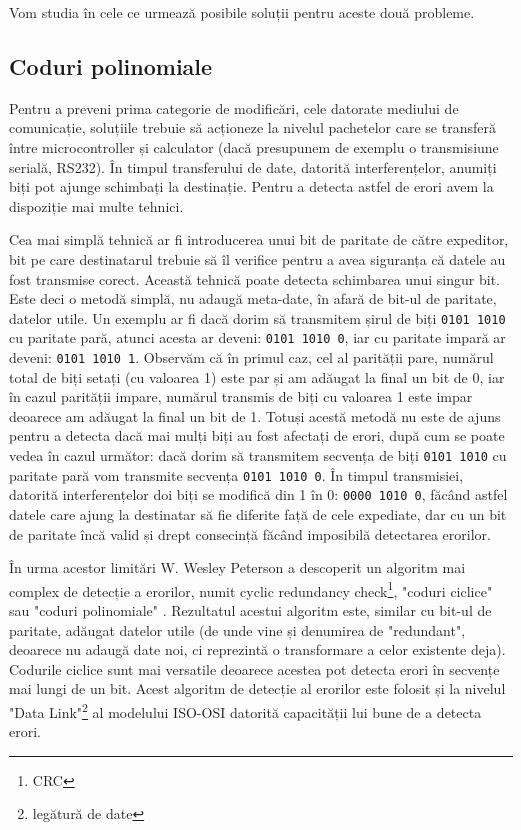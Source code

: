 \documentclass[12pt,a4paper,titlepage]{report}
\begin{document}
Vom studia în cele ce urmează posibile soluții pentru aceste două probleme.

\subsection{Coduri polinomiale}
Pentru a preveni prima categorie de modificări, cele datorate mediului de comunicație, soluțiile trebuie să acționeze la nivelul pachetelor care se transferă între microcontroller și calculator (dacă presupunem de exemplu o transmisiune serială, RS232). În timpul transferului de date, datorită interferențelor, anumiți biți pot ajunge schimbați la destinație. Pentru a detecta astfel de erori avem la dispoziție mai multe tehnici.

Cea mai simplă tehnică ar fi introducerea unui bit de paritate de către expeditor, bit pe care destinatarul trebuie să îl verifice pentru a avea siguranța că datele au fost transmise corect. Această tehnică poate detecta schimbarea unui singur bit. Este deci o metodă simplă, nu adaugă meta-date, în afară de bit-ul de paritate, datelor utile. Un exemplu ar fi dacă dorim să transmitem șirul de biți \texttt{0101 1010} cu paritate pară, atunci acesta ar deveni: \texttt{0101 1010 0}, iar cu paritate impară ar deveni: \texttt{0101 1010 1}. Observăm că în primul caz, cel al parității pare, numărul total de biți setați (cu valoarea 1) este par și am adăugat la final un bit de 0, iar în cazul parității impare, numărul transmis de biți cu valoarea 1 este impar deoarece am adăugat la final un bit de 1. Totuși acestă metodă nu este de ajuns pentru a detecta dacă mai mulți biți au fost afectați de erori, după cum se poate vedea în cazul următor: dacă dorim să transmitem secvența de biți \texttt{0101 1010} cu paritate pară vom transmite secvența \texttt{0101 1010 0}. În timpul transmisiei, datorită interferențelor doi biți se modifică din 1 în 0: \texttt{0000 1010 0}, făcând astfel datele care ajung la destinatar să fie diferite față de cele expediate, dar cu un bit de paritate încă valid și drept consecință făcând imposibilă detectarea erorilor.

În urma acestor limitări W. Wesley Peterson a descoperit un algoritm mai complex de detecție a erorilor, numit cyclic redundancy check\footnote{CRC}, "coduri ciclice" sau "coduri polinomiale" \cite{wikiCrc}. Rezultatul acestui algoritm este, similar cu bit-ul de paritate, adăugat datelor utile (de unde vine și denumirea de "redundant", deoarece nu adaugă date noi, ci reprezintă o transformare a celor existente deja). Codurile ciclice sunt mai versatile deoarece acestea pot detecta erori în secvențe mai lungi de un bit. Acest algoritm de detecție al erorilor este folosit și la nivelul "Data Link"\footnote{legătură de date} al modelului ISO-OSI datorită capacității lui bune de a detecta erori.
\end{document}
